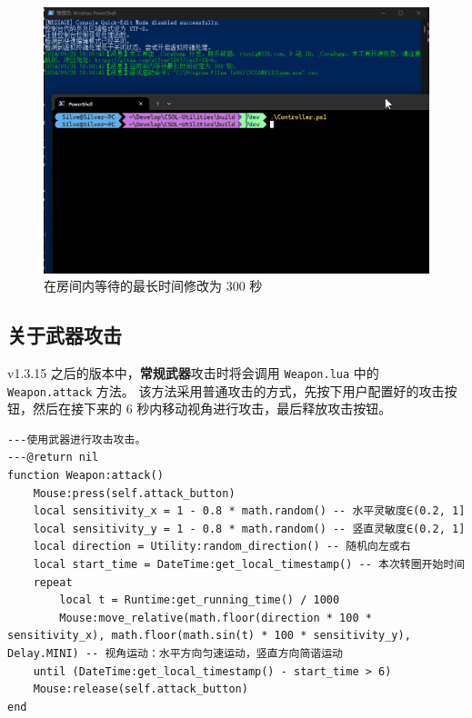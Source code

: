 \begin{figure}[H]
    \Centering
    \includegraphics[width=\textwidth]{docs/assets/advanced/change_max_wait_time_in_room_1.png}
    \caption{在房间内等待的最长时间修改为 300 秒}
    \label{ch7fig-change-max-wait-time-in-room-1}
\end{figure}

\subsection{关于武器攻击}

v1.3.15 之后的版本中，\textbf{常规武器}攻击时将会调用 \lstinline{Weapon.lua} 中的 \lstinline{Weapon.attack} 方法。
该方法采用普通攻击的方式，先按下用户配置好的攻击按钮，然后在接下来的 6 秒内移动视角进行攻击，最后释放攻击按钮。

\begin{verbatim}
---使用武器进行攻击攻击。
---@return nil
function Weapon:attack()
    Mouse:press(self.attack_button)
    local sensitivity_x = 1 - 0.8 * math.random() -- 水平灵敏度∈(0.2, 1]
    local sensitivity_y = 1 - 0.8 * math.random() -- 竖直灵敏度∈(0.2, 1]
    local direction = Utility:random_direction() -- 随机向左或右
    local start_time = DateTime:get_local_timestamp() -- 本次转圈开始时间
    repeat
        local t = Runtime:get_running_time() / 1000
        Mouse:move_relative(math.floor(direction * 100 * sensitivity_x), math.floor(math.sin(t) * 100 * sensitivity_y), Delay.MINI) -- 视角运动：水平方向匀速运动，竖直方向简谐运动
    until (DateTime:get_local_timestamp() - start_time > 6)
    Mouse:release(self.attack_button)
end
\end{verbatim}

